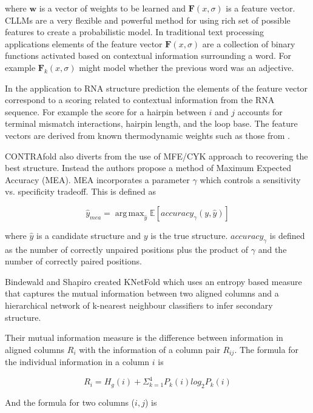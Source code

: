 \documentclass[journal]{IEEEtran}
\DeclareMathOperator*{\argmax}{arg\,max}
\begin{document}
where $\mathbf{w}$ is a vector of weights to be learned and $\mathbf{F}(x, \sigma)$ is a feature vector. CLLMs are a very flexible and powerful method for using rich set of possible features to create a probabilistic model. In traditional text processing applications elements of the feature vector $\mathbf{F}(x, \sigma)$ are a collection of binary functions activated based on contextual information surrounding a word. For example $\mathbf{F}_k(x, \sigma)$ might model whether the previous word was an adjective. 

In the application to RNA structure prediction the elements of the feature vector correspond to a scoring related to contextual information from the RNA sequence. For example the score for a hairpin between $i$ and $j$ accounts for terminal mismatch interactions, hairpin length, and the loop base. The feature vectors are derived from known thermodynamic weights such as those from \cite{mathews1999expanded}.

CONTRAfold also diverts from the use of MFE/CYK approach to recovering the best structure. Instead the authors propose a method of Maximum Expected Accuracy (MEA). MEA incorporates a parameter $\gamma$ which controls a sensitivity vs. specificity tradeoff. This is defined as

\begin{equation}
	\hat{y}_{mea} = \argmax_{\hat{y}} \mathbb{E}[accuracy_{\gamma}(y, \hat{y})]
\end{equation}

where $\hat{y}$ is a candidate structure and $y$ is the true structure. $accuracy_{\gamma}$ is defined as the number of correctly unpaired positions plus the product of $\gamma$ and the number of correctly paired positions. 

Bindewald and Shapiro \cite{bindewald2006rna} created KNetFold which uses an entropy based measure that captures the mutual information between two aligned columns and a hierarchical network of k-nearest neighbour classifiers to infer secondary structure. 

Their mutual information measure is the difference between information in aligned columns $R_i$ with the information of a column pair $R_{ij}$. The formula for the individual information in a column $i$ is 
	
\begin{equation}
	R_i = H_g(i) + \Sigma_{k=1}^4 P_k(i) log_2 P_k(i)
\end{equation}

And the formula for two columns ($i, j$) is
\end{document}

